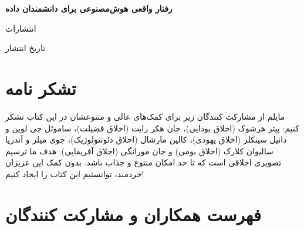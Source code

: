 \documentclass[12pt,oneside]{book}
\begin{document}
    \frontmatter

    \begin{titlepage}
        \begin{center}
            \vspace*{1cm}

            {\huge \textbf{رفتار واقعی هوش‌مصنوعی برای دانشمندان داده}}

            \vspace{0.5cm}


            \LARGE انتشارات

            \large تاریخ انتشار

        \end{center}
    \end{titlepage}

    \tableofcontents

    \newpage

    \section*{تشکر نامه}
    مایلم از مشارکت کنندگان زیر برای کمک‌های عالی و متنوعشان در این کتاب تشکر کنیم: پیتر هرشوک (اخلاق بودایی)، جان هکر رایت (اخلاق فضیلت)، ساموئل جی لوین و دانیل سینکلر (اخلاق یهودی)، کالین مارشال (اخلاق دئونتولوژیک)، جوی میلر و آندریا سالیوان کلارک (اخلاق بومی) و جان مورانگی (اخلاق آفریقایی). هدف ما ترسیم تصویری اخلاقی است که تا حد امکان منتوع و جذاب باشد. بدون کمک این عزیزان خردمند، توانستیم این کتاب را ایجاد کنیم!

    \newpage

    \section*{فهرست همکاران و مشارکت کنندگان}
\end{document}
